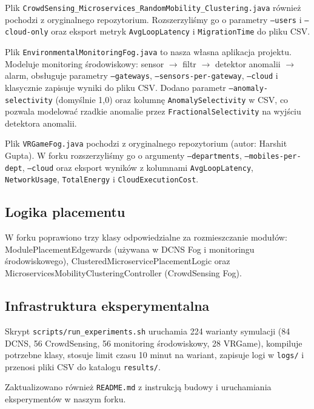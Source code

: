 \documentclass[
    oneside,            %
    left=2.5cm,         %
    right=2.5cm,        %
    top=2.5cm,          %
    bottom=3cm,         %
    bindingoffset=6mm,  %
    nohyphenation=false %
]{eiti/eiti-report}
\begin{document}
Plik \texttt{CrowdSensing\_Microservices\_RandomMobility\_Clustering.java} również pochodzi z oryginalnego repozytorium. Rozszerzyliśmy go o parametry \texttt{--users} i \texttt{--cloud-only} oraz eksport metryk \texttt{AvgLoopLatency} i \texttt{MigrationTime} do pliku CSV.

Plik \texttt{EnvironmentalMonitoringFog.java} to nasza własna aplikacja projektu. Modeluje monitoring środowiskowy: sensor $\rightarrow$ filtr $\rightarrow$ detektor anomalii $\rightarrow$ alarm, obsługuje parametry \texttt{--gateways}, \texttt{--sensors-per-gateway}, \texttt{--cloud} i klasycznie zapisuje wyniki do pliku CSV. Dodano parametr \texttt{--anomaly-selectivity} (domyślnie 1,0) oraz kolumnę \texttt{AnomalySelectivity} w CSV, co pozwala modelować rzadkie anomalie przez \texttt{FractionalSelectivity} na wyjściu detektora anomalii.

Plik \texttt{VRGameFog.java} pochodzi z oryginalnego repozytorium (autor: Harshit Gupta). W forku rozszerzyliśmy go o argumenty \texttt{--departments}, \texttt{--mobiles-per-dept}, \texttt{--cloud} oraz eksport wyników z kolumnami \texttt{AvgLoopLatency}, \texttt{NetworkUsage}, \texttt{TotalEnergy} i \texttt{CloudExecutionCost}.

\subsection*{Logika placementu}
W forku poprawiono trzy klasy odpowiedzialne za rozmieszczanie modułów: ModulePlacementEdgewards (używana w DCNS Fog i monitoringu środowiskowego), ClusteredMicroservicePlacementLogic oraz MicroservicesMobilityClusteringController (CrowdSensing Fog).

\subsection*{Infrastruktura eksperymentalna}
Skrypt \texttt{scripts/run\_experiments.sh} uruchamia 224 warianty symulacji (84 DCNS, 56 CrowdSensing, 56 monitoring środowiskowy, 28 VRGame), kompiluje potrzebne klasy, stosuje limit czasu 10 minut na wariant, zapisuje logi w \texttt{logs/} i przenosi pliki CSV do katalogu \texttt{results/}.

Zaktualizowano również \texttt{README.md} z instrukcją budowy i uruchamiania eksperymentów w naszym forku.
\end{document}
